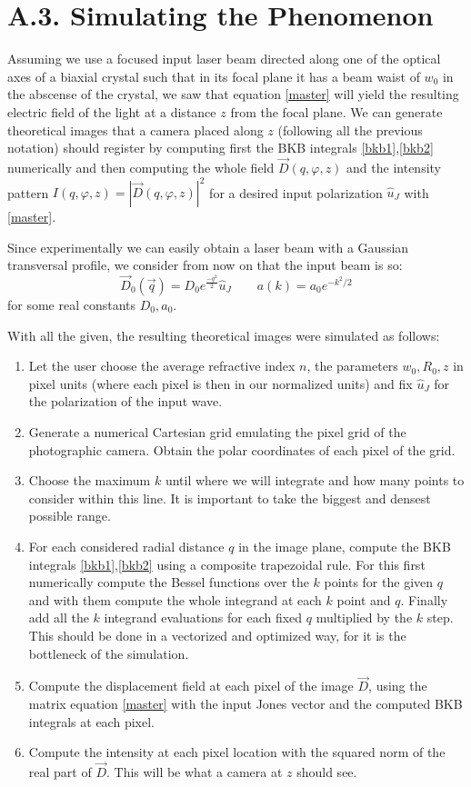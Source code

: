 \documentclass[11pt, a4paper, twoside]{article} %
\begin{document}
\section*{A.3. Simulating the Phenomenon }
Assuming we use a focused input laser beam directed along one of the optical axes of a biaxial crystal such that in its focal plane it has a beam waist of $w_0$ in the abscense of the crystal, we saw that equation \eqref{master} will yield the resulting electric field of the light at a distance $z$ from the focal plane.    We can generate theoretical images that a camera placed along $z$ (following all the previous notation) should register by computing first the BKB integrals \eqref{bkb1},\eqref{bkb2} numerically and then computing the whole field $\vec{D}(q,\varphi,z)$ and the intensity pattern $I(q,\varphi,z)=|\vec{D}(q,\varphi,z)|^2$  for a desired input polarization $\hat{u}_J$ with \eqref{master}.

Since experimentally we can easily obtain a laser beam with a Gaussian transversal profile, we consider from now on that the input beam is so:
\begin{equation}\label{Four}
\vec{D}_0(\vec{q})=D_0e^{\frac{-q^2}{2}}\hat{u}_J \quad \quad a(k)=a_0e^{-k^2/2}
\end{equation}
for some real constants $D_0,a_0$.

With all the given, the resulting theoretical images were simulated as follows:
\begin{enumerate}
\item Let the user choose the average refractive index $n$, the parameters $w_0,R_0,z$ in pixel units (where each pixel is then in our normalized units) and fix $\hat{u}_J$ for the polarization of the input wave.
\item Generate a numerical Cartesian grid emulating the pixel grid of the photographic camera. Obtain the polar coordinates of each pixel of the grid. 
\item Choose the maximum $k$ until where we will integrate and how many points to consider within this line. It is important to take the biggest and densest possible range.
\item For each considered radial distance $q$ in the image plane, compute the BKB integrals \eqref{bkb1},\eqref{bkb2} using a composite trapezoidal rule. For this first numerically compute the Bessel functions over the $k$ points for the given $q$ and with them compute the whole integrand at each $k$ point and $q$. Finally add all the $k$ integrand evaluations for each fixed $q$ multiplied by the $k$ step. This should be done in a vectorized and optimized way, for it is the bottleneck of the simulation.
\item Compute the displacement field at each pixel of the image $\vec{D}$, using the matrix equation \eqref{master} with the input Jones vector and the computed BKB integrals at each pixel.
\item Compute the intensity at each pixel location with the squared norm of the real part of $\vec{D}$. This will be what a camera at $z$ should see.
\end{enumerate}
\end{document}
